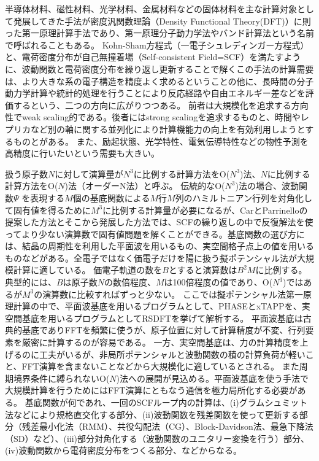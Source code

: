 半導体材料、磁性材料、光学材料、金属材料などの固体材料を主な計算対象として発展してきた手法が密度汎関数理論（Density Functional Theory(DFT)）に則った第一原理計算手法であり、第一原理分子動力学法やバンド計算法という名前で呼ばれることもある。
Kohn-Sham方程式（一電子シュレディンガー方程式）と、電荷密度分布が自己無撞着場（Self-consistent Field=SCF）を満たすように、波動関数と電荷密度分布を繰り返し更新することで解くこの手法の計算需要は、より大きな系の電子構造を精度よく求めるということの他に、長時間の分子動力学計算や統計的処理を行うことにより反応経路や自由エネルギー差などを評価するという、二つの方向に広がりつつある。
前者は大規模化を追求する方向性でweak scaling的である。後者にはstrong scalingを追求するものと、時間やレプリカなど別の軸に関する並列化により計算機能力の向上を有効利用しようとするものとがある。
また、励起状態、光学特性、電気伝導特性などの物性予測を高精度に行いたいという需要も大きい。

扱う原子数$N$に対して演算量が$N^3$に比例する計算方法をO($N^3$)法、$N$に比例する計算方法をO($N$)法（オーダーN法）と呼ぶ。
伝統的なO($N^3$)法の場合、波動関数$\Psi$ を表現する$M$個の基底関数による$M$行$M$列のハミルトニアン行列を対角化して固有値を得るために$M^3$に比例する計算量が必要になるが、CarとParrinelloの提案した方法とそこから発展した方法では、SCFの繰り返しの中で反復解法を使ってより少ない演算数で固有値問題を解くことができる。基底関数の選び方には、結晶の周期性を利用した平面波を用いるもの、実空間格子点上の値を用いるものなどがある。全電子ではなく価電子だけを陽に扱う擬ポテンシャル法が大規模計算に適している。
価電子軌道の数を$B$とすると演算数は$B^2M$に比例する。典型的には、$B$は原子数$N$の数倍程度、$M$は100倍程度の値であり、O($N^3$)ではあるが$M^3$の演算数に比較すればずっと少ない。
ここでは擬ポテンシャル法第一原理計算の中で、平面波基底を用いるプログラムとして、PHASEとxTAPPを、実空間基底を用いるプログラムとしてRSDFTを挙げて解析する。
平面波基底は古典的基底でありFFTを頻繁に使うが、原子位置に対して計算精度が不変、行列要素を厳密に計算するのが容易である。
一方、実空間基底は、力の計算精度を上げるのに工夫がいるが、非局所ポテンシャルと波動関数の積の計算負荷が軽いこと、FFT演算を含まないことなどから大規模化に適しているとされる。
また周期境界条件に縛られないO($N$)法への展開が見込める。平面波基底を使う手法で大規模計算を行うためにはFFT演算にともなう通信を極力局所化する必要がある。
基底関数が何であれ、一回のSCFループ内の計算は、(i)グラムシュミット法などにより規格直交化する部分、(ii)波動関数を残差関数を使って更新する部分（残差最小化法（RMM）、共役勾配法（CG）、Block-Davidson法、最急下降法（SD）など）、(iii)部分対角化する（波動関数のユニタリー変換を行う）部分、(iv)波動関数から電荷密度分布をつくる部分、などからなる。

